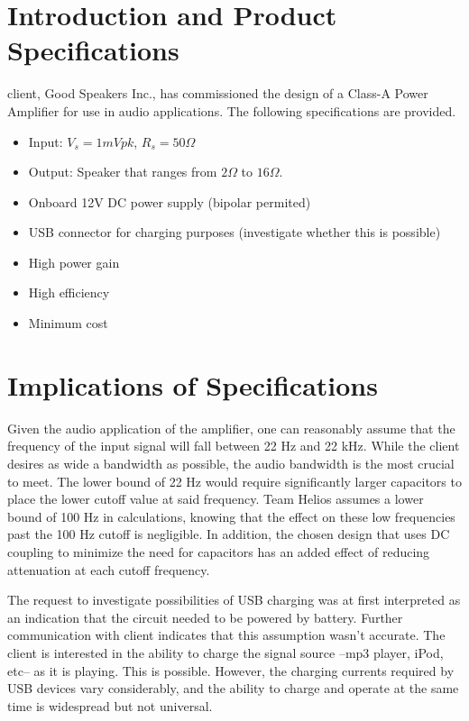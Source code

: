 \documentclass[journal]{IEEEtran}
\begin{document}
\section{Introduction and Product Specifications}
 client, Good Speakers Inc., has commissioned the design of a Class-A Power Amplifier for use in audio applications. The following specifications are provided. 

\begin{itemize}
\item
Input:  $V_{s}=1 mVpk$, $R_{s}=50\Omega$
\item
Output: Speaker that ranges from $2\Omega$ to $16\Omega$.
\item
Onboard 12V DC power supply (bipolar permited)
\item
USB connector for charging purposes (investigate whether this is possible)
\item
High power gain
\item
High efficiency
\item
Minimum cost
\end{itemize}


\section{Implications of Specifications}

Given the audio application of the amplifier, one can reasonably assume that the frequency of the input signal will fall between 22 Hz and 22 kHz. While the client desires as wide a bandwidth as possible, the audio bandwidth is the most crucial to meet. The lower bound of 22 Hz would require significantly larger capacitors to place the lower cutoff value at said frequency. Team Helios assumes a lower bound of 100 Hz in calculations, knowing that the effect on these low frequencies past the 100 Hz cutoff is negligible. In addition, the chosen design that uses DC coupling to minimize the need for capacitors has an added effect of reducing attenuation at each cutoff frequency.

The request to investigate possibilities of USB charging was at first interpreted as an indication that the circuit needed to be powered by battery. Further communication with client indicates that this assumption wasn't accurate. The client is interested in the ability to charge the signal source --mp3 player, iPod, etc-- as it is playing. This is possible. However, the charging currents required by USB devices vary considerably, and the ability to charge and operate at the same time is widespread but not universal.
\end{document}
